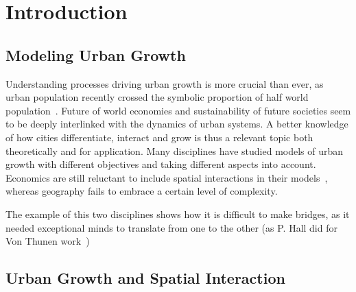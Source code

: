 \documentclass[Royal,sageh,times]{sagej}
\def \draft {1}
\newcommand{\com}[1]{
    \ifthenelse{\draft=1}{\textcolor{red}{\textbf{C : } #1}}{}
}
\begin{document}
\section*{Introduction}

\subsection*{Modeling Urban Growth}

Understanding processes driving urban growth is more crucial than ever, as urban population recently crossed the symbolic proportion of half world population~\cite{}.%
 Future of world economies and sustainability of future societies seem to be deeply interlinked with the dynamics of urban systems.%
 A better knowledge of how cities differentiate, interact and grow is thus a relevant topic both theoretically and for application. Many disciplines have studied models of urban growth with different objectives and taking different aspects into account. Economics are still reluctant to include spatial interactions in their models~\cite{krugman1998space}, whereas geography fails to embrace a certain level of complexity. \com{what does it mean ?}
  The example of this two disciplines shows how it is difficult to make bridges, as it needed exceptional minds to translate from one to the other (as P. Hall did for Von Thunen work~\cite{taylor2016polymath}) %





\subsection*{Urban Growth and Spatial Interaction}

\end{document}
